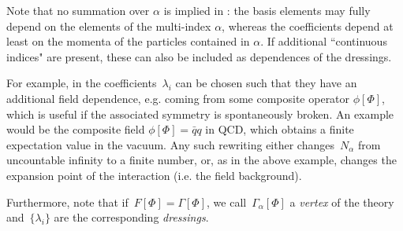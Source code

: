 \documentclass[10pt,prd,nofootinbib,superscriptaddress,twocolumn]{revtex4-2}
\begin{document}
Note that no summation over $\alpha$ is implied in : the basis elements may fully depend on the elements of the multi-index $\alpha$, whereas the coefficients depend at least on the momenta of the particles  contained in $\alpha$.
If additional ``continuous indices" are present, these can also be included as dependences of the dressings. 

For example, in  the coefficients~$\lambda_i$ can be chosen such that they have an additional field dependence, e.g. coming from some composite operator $\phi[\Phi]$, which is useful if the associated symmetry is spontaneously broken. 
An example would be the composite field $\phi[\Phi] = \bar q q$ in QCD, which obtains a finite expectation value in the vacuum.
Any such rewriting either changes~$N_\alpha$ from uncountable infinity to a finite number, or, as in the above example, changes the expansion point of the interaction (i.e. the field background).

Furthermore, note that if~$F[\Phi] = \Gamma[\Phi]$, we call~$\Gamma_\alpha[\Phi]$ a \textit{vertex} of the theory and~$\{\lambda_i\}$ are the corresponding \textit{dressings}.

\newpage

\end{document}
